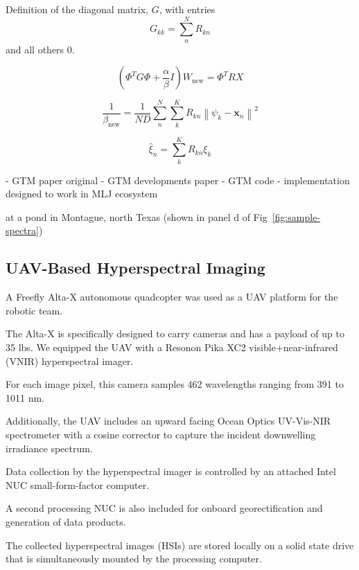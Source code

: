 \documentclass[remotesensing,article,submit,pdftex,moreauthors]{Definitions/mdpi}
\begin{document}
Definition of the diagonal matrix, $G$, with entries
\begin{equation}
    G_{kk}  = \sum\limits_n^N R_{kn}
\end{equation}
and all others $0$.

\begin{equation}\label{eq:W-update}
    \left(\Phi^T G \Phi + \dfrac{\alpha}{\beta}I \right)W_{\text{new}} = \Phi^T R X 
\end{equation}

\begin{equation}
    \frac{1}{\beta_{\text{new}}} = \frac{1}{ND} \sum\limits_{n}^{N} \sum\limits_{k}^{K} R_{kn} \left\lVert \psi_k - \mathbf{x}_n \right\rVert^2
\end{equation}


\begin{equation}
    \hat{\xi}_n = \sum_{k}^K R_{kn}\xi_k
\end{equation}

- GTM paper original \cite{gtm-bishop-1}
- GTM developments paper \cite{gtm-bishop-2}
- GTM code \cite{gtm-code}
- implementation designed to work in MLJ ecosystem \cite{blaom2020mlj}


at a pond in Montague, north Texas (shown in panel d of Fig~\ref{fig:sample-spectra})


\subsection{UAV-Based Hyperspectral Imaging}
A Freefly Alta-X autonomous quadcopter was used as a UAV platform for the robotic team.

The Alta-X is specifically designed to carry cameras and has a payload of up to 35 lbs. We equipped the UAV with a Resonon Pika XC2 visible+near-infrared (VNIR) hyperspectral imager. 

For each image pixel, this camera samples 462 wavelengths ranging from 391 to 1011 nm. 

Additionally, the UAV includes an upward facing Ocean Optics UV-Vis-NIR spectrometer with a cosine corrector to capture the incident downwelling irradiance spectrum.

Data collection by the hyperspectral imager is controlled by an attached Intel NUC small-form-factor computer. 

A second processing NUC is also included for onboard georectification and generation of data products.

The collected hyperspectral images (HSIs) are stored locally on a solid state drive that is simultaneously mounted by the processing computer.
\end{document}
